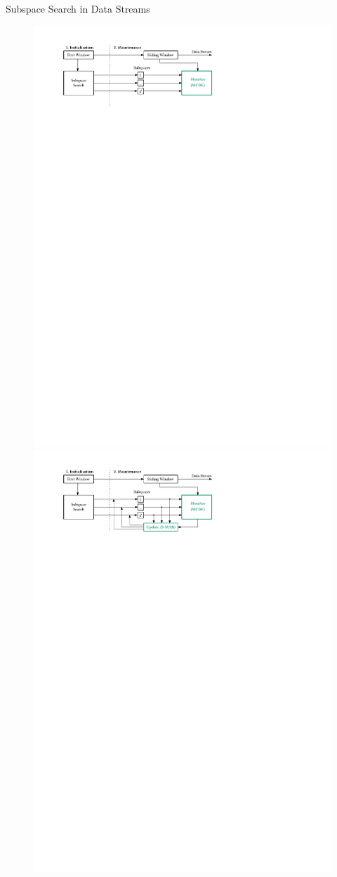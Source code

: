 \documentclass[16pt,usenames,dvipsnames, notheorems]{beamer}
\theoremstyle{definition}
\theoremstyle{example}
\theoremstyle{plain}
\begin{document}
\begin{frame}{Subspace Search in Data Streams}
\begin{figure}
\begin{overprint}
		\includegraphics[width=0.9\linewidth]{figures/SGMRD_workflow_3-compressed.pdf}
		\onslide<5>
		\includegraphics[width=0.9\linewidth]{figures/SGMRD_workflow_2-compressed.pdf}

\end{overprint}
\end{figure}
\end{frame}
\end{document}
